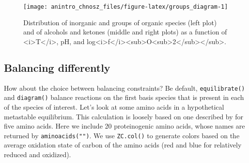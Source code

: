\documentclass[]{tufte-handout}
\newenvironment{Shaded}{}{}
\newcommand{\KeywordTok}[1]{\textcolor[rgb]{0.00,0.44,0.13}{\textbf{#1}}}
\newcommand{\DataTypeTok}[1]{\textcolor[rgb]{0.56,0.13,0.00}{#1}}
\newcommand{\DecValTok}[1]{\textcolor[rgb]{0.25,0.63,0.44}{#1}}
\newcommand{\FloatTok}[1]{\textcolor[rgb]{0.25,0.63,0.44}{#1}}
\newcommand{\StringTok}[1]{\textcolor[rgb]{0.25,0.44,0.63}{#1}}
\newcommand{\CommentTok}[1]{\textcolor[rgb]{0.38,0.63,0.69}{\textit{#1}}}
\newcommand{\OtherTok}[1]{\textcolor[rgb]{0.00,0.44,0.13}{#1}}
\newcommand{\OperatorTok}[1]{\textcolor[rgb]{0.40,0.40,0.40}{#1}}
\newcommand{\NormalTok}[1]{#1}
\begin{document}
\begin{Shaded}
\end{Shaded}

\begin{figure}
\texttt{[image: anintro\_chnosz\_files/figure-latex/groups\_diagram-1]} \caption[Distribution of inorganic and groups of organic species (left plot) and of alcohols and ketones (middle and right plots) as a function of <i>T</i>, pH, and log<i>f</i><sub>O<sub>2</sub></sub>]{Distribution of inorganic and groups of organic species (left plot) and of alcohols and ketones (middle and right plots) as a function of <i>T</i>, pH, and log<i>f</i><sub>O<sub>2</sub></sub>.}\label{fig:groups_diagram}
\end{figure}

\subsection{Balancing differently}\label{balancing-differently}

How about the choice between balancing constraints? Be default,
{\texttt{equilibrate()}} and {\texttt{diagram()}} balance reactions on
the first basis species that is present in each of the species of
interest. Let's look at some amino acids in a hypothetical metastable
equilibrium. This calculation is loosely based on one described by
\citet{Sho90b} for five amino acids. Here we include 20 proteinogenic
amino acids, whose names are returned by {\texttt{aminoacids("")}}. We
use {\texttt{ZC.col()}} to generate colors based on the average
oxidation state of carbon of the amino acids (red and blue for
relatively reduced and oxidized).
\end{document}
